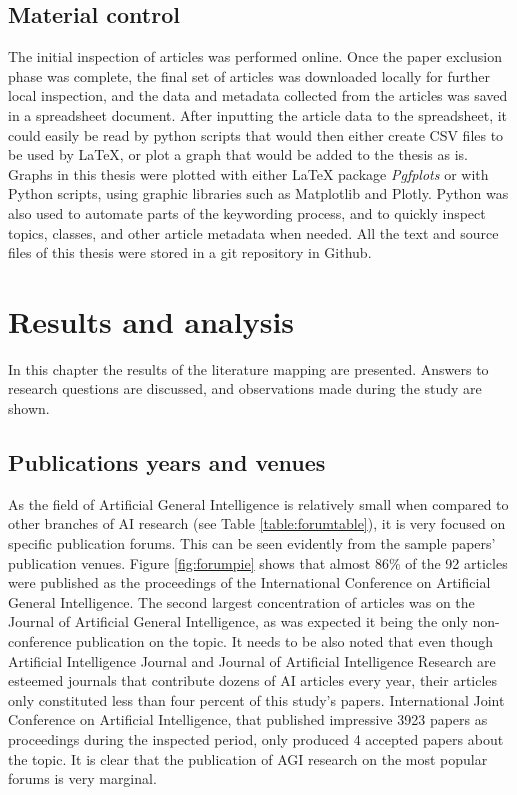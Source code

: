 \documentclass[utf8,english]{gradu3}
\begin{document}
\section{Material control}

The initial inspection of articles was performed online. Once the paper
exclusion phase was complete, the final set of articles was downloaded locally
for further local inspection, and the data and metadata collected from the
articles was saved in a spreadsheet document. After inputting the article data
to the spreadsheet, it could easily be read by python scripts that would then
either create CSV files to be used by \LaTeX, or plot a graph that would be
added to the thesis as is. Graphs in this thesis were plotted with either \LaTeX
package \emph{Pgfplots} or with Python scripts, using graphic libraries such as
Matplotlib and Plotly. Python was also used to automate parts of the keywording
process, and to quickly inspect topics, classes, and other article metadata when
needed. All the text and source files of this thesis were stored in a git
repository in Github.


\chapter{Results and analysis}
\label{chap:results}

 In this chapter the results of the literature mapping are presented. Answers to
 research questions are discussed, and observations made during the study are
 shown. 

 \section{Publications years and venues}

 As the field of Artificial General Intelligence is relatively small when
 compared to other branches of AI research (see Table \ref{table:forumtable}), it is
 very focused on specific publication forums. This can be seen evidently from
 the sample papers' publication venues. Figure \ref*{fig:forumpie} shows that
 almost 86\% of the 92 articles were published as the proceedings of the
 International Conference on Artificial General Intelligence. The second largest
 concentration of articles was on the Journal of Artificial General
 Intelligence, as was expected it being the only non-conference publication on
 the topic. It needs to be also noted that even though Artificial Intelligence
 Journal and Journal of Artificial Intelligence Research are esteemed journals
 that contribute dozens of AI articles every year, their articles only
 constituted less than four percent of this study's papers. International Joint
 Conference on Artificial Intelligence, that published impressive 3923 papers as
 proceedings during the inspected period, only produced 4 accepted papers about
 the topic. It is clear that the publication of AGI research on the most popular
 forums is very marginal.
\end{document}
